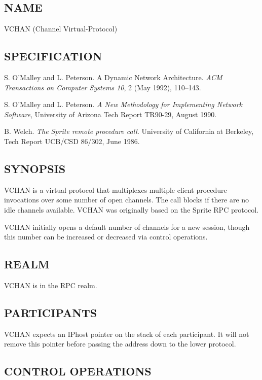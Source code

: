 \subsection*{NAME}

\noindent VCHAN (Channel Virtual-Protocol)

\subsection*{SPECIFICATION}

\noindent 
S. O'Malley and L. Peterson.  A Dynamic Network Architecture.  {\it
ACM Transactions on Computer Systems 10}, 2 (May 1992), 110--143.

\medskip
\noindent  S. O'Malley and L. Peterson. {\it A New Methodology for
Implementing Network Software}, University of Arizona Tech Report
TR90-29, August 1990.

\medskip
\noindent  B. Welch. {\it The Sprite remote procedure call}. 
University of California at Berkeley, Tech Report UCB/CSD 86/302,
June 1986.

\subsection*{SYNOPSIS}

\noindent VCHAN is a virtual protocol that multiplexes multiple client
procedure invocations over some number of open channels. The call
blocks if there are no idle channels available.  VCHAN was originally
based on the Sprite RPC protocol.

VCHAN initially opens a default number of channels for a new session,
though this number can be increased or decreased via control
operations. 

\subsection*{REALM}

VCHAN is in the RPC realm.


\subsection*{PARTICIPANTS}

VCHAN expects an IPhost pointer on the stack of each participant.  It
will not remove this pointer before passing the address down to the
lower protocol. 


\subsection*{CONTROL OPERATIONS}


